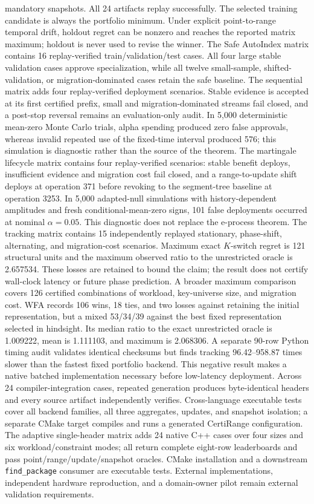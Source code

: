 \documentclass[10pt]{article}
\begin{document}
mandatory snapshots. All 24 artifacts replay successfully. The selected
training candidate is always the portfolio minimum. Under explicit
point-to-range temporal drift, holdout regret can be nonzero and reaches the
reported matrix maximum; holdout is never used to revise the winner.
The Safe AutoIndex matrix contains 16 replay-verified train/validation/test
cases. All four large stable validation cases approve specialization, while
all twelve small-sample, shifted-validation, or migration-dominated cases
retain the safe baseline.
The sequential matrix adds four replay-verified deployment scenarios. Stable
evidence is accepted at its first certified prefix, small and
migration-dominated streams fail closed, and a post-stop reversal remains an
evaluation-only audit. In 5,000 deterministic mean-zero Monte Carlo trials,
alpha spending produced zero false approvals, whereas invalid repeated use of
the fixed-time interval produced 576; this simulation is diagnostic rather
than the source of the theorem.
The martingale lifecycle matrix contains four replay-verified scenarios:
stable benefit deploys, insufficient evidence and migration cost fail closed,
and a range-to-update shift deploys at operation 371 before revoking to the
segment-tree baseline at operation 3253. In 5,000 adapted-null simulations
with history-dependent amplitudes and fresh conditional-mean-zero signs, 101
false deployments occurred at nominal $\alpha=0.05$. This diagnostic does not
replace the e-process theorem.
The tracking matrix contains 15 independently replayed stationary,
phase-shift, alternating, and migration-cost scenarios. Maximum exact
$K$-switch regret is 121 structural units and the maximum observed ratio to
the unrestricted oracle is 2.657534. These losses are retained to bound the
claim; the result does not certify wall-clock latency or future phase
prediction.
A broader maximum comparison covers 126 certified combinations of workload,
key-universe size, and migration cost. WFA records 106 wins, 18 ties, and two
losses against retaining the initial representation, but a mixed 53/34/39
against the best fixed representation selected in hindsight. Its median ratio
to the exact unrestricted oracle is 1.009222, mean is 1.111103, and maximum is
2.068306. A separate 90-row Python timing audit validates identical checksums
but finds tracking 96.42--958.87 times slower than the fastest fixed portfolio
backend. This negative result makes a native batched implementation necessary
before low-latency deployment.
Across 24 compiler-integration cases, repeated generation produces
byte-identical headers and every source artifact independently verifies.
Cross-language executable tests cover all backend families, all three
aggregates, updates, and snapshot isolation; a separate CMake target compiles
and runs a generated CertiRange configuration.
The adaptive single-header matrix adds 24 native C++ cases over four sizes and
six workload/constraint modes; all return complete eight-row leaderboards and
pass point/range/update/snapshot oracles. CMake installation and a downstream
\texttt{find\_package} consumer are executable tests.
External implementations, independent hardware reproduction, and a
domain-owner pilot remain external validation requirements.
\end{document}
